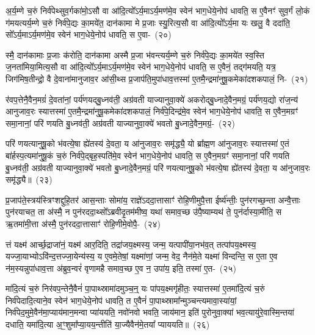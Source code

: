 अ॒र्य॒म्णे च॒रुं निर्व॑पेथ्सुव॒र्गका॑मो॒\-ऽसौ वा आ॑दि॒त्यो᳚\-ऽर्य॒मा\-ऽर्य॒मण॑मे॒व स्वेन॑ भाग॒\-धेये॒नोप॑ धावति॒ स ए॒वैनꣳ॑ सुव॒र्गं लो॒कं ग॑मयत्यर्य॒म्णे च॒रुं निर्व॑पे॒द्यः का॒मये॑त॒ दान॑कामा मे प्र॒जाः स्यु॒रित्य॒सौ वा आ॑दि॒त्यो᳚\-ऽर्य॒मा यः खलु॒ वै ददा॑ति॒ सो᳚\-ऽर्य॒मा\-ऽर्य॒मण॑मे॒व स्वेन॑ भाग॒\-धेये॒नोप॑ धावति॒ स ए॒वा-~(२०)\ip

स्मै॒ दान॑कामाः प्र॒जाः क॑रोति॒ दान॑कामा अस्मै प्र॒जा भ॑वन्त्यर्य॒म्णे च॒रुं निर्व॑पे॒द्यः का॒मये॑त स्व॒स्ति ज॒नता॑मिया॒मित्य॒सौ वा आ॑दि॒त्यो᳚\-ऽर्य॒मा\-ऽर्य॒मण॑मे॒व स्वेन॑ भाग॒\-धेये॒नोप॑ धावति॒ स ए॒वैनं॒ तद्ग॑मयति॒ यत्र॒ जिग॑मिष॒तीन्द्रो॒ वै दे॒वाना॑मानुजाव॒र आ॑सी॒थ्स प्र॒जा\-प॑ति॒मुपा॑धाव॒त्तस्मा॑ ए॒तमै॒न्द्रमा॑नुषू॒कमेका॑\-दश\-कपालं॒ नि-~(२१)\ip

र॑वप॒त्तेनै॒वैन॒मग्रं॑ दे॒वता॑नां॒ पर्य॑णयद्बु॒ध्नव॑ती॒ अग्र॑वती याज्यानुवा॒क्ये॑ अकरोद्बु॒ध्नादे॒वैन॒मग्रं॒ पर्य॑णय॒द्यो रा॑ज॒न्य॑ आनुजाव॒रः स्यात्तस्मा॑ ए॒तमै॒न्द्रमा॑नुषू॒कमेका॑\-दश\-कपालं॒ निर्व॑पे॒दिन्द्र॑मे॒व स्वेन॑ भाग॒\-धेये॒नोप॑ धावति॒ स ए॒वैन॒मग्रꣳ॑ समा॒नानां॒ परि॑ णयति बु॒ध्नव॑ती॒ अग्र॑वती याज्यानुवा॒क्ये॑ भवतो बु॒ध्नादे॒वैन॒मग्रं॒-~(२२)\ip

परि॑ णयत्यानुषू॒को भ॑वत्ये॒षा ह्ये॑तस्य॑ दे॒वता॒ य आ॑नुजाव॒रः समृ॑द्ध्यै॒ यो ब्रा᳚ह्म॒ण आ॑नुजाव॒रः स्यात्तस्मा॑ ए॒तं बा॑र्\mbox{}हस्प॒त्यमा॑नुषू॒कं च॒रुं निर्व॑पे॒द्बृह॒स्पति॑मे॒व स्वेन॑ भाग॒\-धेये॒नोप॑ धावति॒ स ए॒वैन॒मग्रꣳ॑ समा॒नानां॒ परि॑ णयति बु॒ध्नव॑ती॒ अग्र॑वती याज्यानुवा॒क्ये॑ भवतो बु॒ध्नादे॒वैन॒मग्रं॒ परि॑ णयत्यानुषू॒को भ॑वत्ये॒षा ह्ये॑तस्य॑ दे॒वता॒ य आ॑नुजाव॒रः समृ॑द्ध्यै॥~(२३)\ip

{\anuvakamend[{ए॒व निरग्र॑मे॒तस्य॑ च॒त्वारि॑ च}]}

प्र॒जा\-प॑ते॒स्त्रय॑स्त्रिꣳशद्दुहि॒तर॑ आस॒न्ताः सोमा॑य॒ राज्ञे॑\-ऽददा॒त्तासाꣳ॑ रोहि॒णीमुपै॒त्ता ईर्ष्य॑न्तीः॒ पुन॑रगच्छ॒न्ता अन्वै॒त्ताः पुन॑रयाचत॒ ता अ॑स्मै॒ न पुन॑रददा॒थ्सो᳚\-ऽब्रवीदृ॒तम॑मीष्व॒ यथा॑ समाव॒च्छ उ॑पै॒ष्याम्यथ॑ ते॒ पुन॑र्दास्या॒मीति॒ स ऋ॒तमा॑मी॒त्ता अ॑स्मै॒ पुन॑रददा॒त्तासाꣳ॑ रोहि॒णीमे॒वोपै॒-~(२४)\ip

त्तं यक्ष्म॑ आर्च्छ॒द्राजा॑नं॒ यक्ष्म॑ आर॒दिति॒ तद्रा॑जय॒क्ष्मस्य॒ जन्म॒ यत्पापी॑या॒नभ॑व॒त् तत्पा॑प\-य॒क्ष्मस्य॒ यज्जा॒याभ्यो\-ऽवि॑न्द॒त्तज्जा॒येन्य॑स्य॒ य ए॒वमे॒तेषां॒ यक्ष्मा॑णां॒ जन्म॒ वेद॒ नैन॑मे॒ते यक्ष्मा॑ विन्दन्ति॒ स ए॒ता ए॒व न॑म॒स्यन्नुपा॑धाव॒त्ता अ॑ब्रुव॒न्वरं॑ वृणामहै समाव॒च्छ ए॒व न॒ उपा॑य॒ इति॒ तस्मा॑ ए॒त-~(२५)\ip

मा॑दि॒त्यं च॒रुं निर॑वप॒न्तेनै॒वैनं॑ पा॒पाथ्स्रामा॑दमुञ्च॒न्॒ यः पा॑पय॒क्ष्मगृ॑हीतः॒ स्यात्तस्मा॑ ए॒तमा॑दि॒त्यं च॒रुं निर्व॑पेदादि॒त्याने॒व स्वेन॑ भाग॒\-धेये॒नोप॑ धावति॒ त ए॒वैनं॑ पा॒पाथ्स्रामा᳚न्मुञ्च\-न्त्यमा\-वा॒स्या॑यां॒ निर्व॑पेद॒मुमे॒वैन॑मा॒प्याय॑मान॒मन्वा प्या॑ययति॒ नवो॑नवो भवति॒ जाय॑\-मान॒ इति॑ पुरोनुवा॒क्या॑ भव॒त्यायु॑रे॒वास्मि॒न्तया॑ दधाति॒ यमा॑\-दि॒त्या अ॒ꣳ॒शुमा᳚प्या॒यय॒न्तीति॑ या॒ज्यैवैन॑मे॒तया᳚ प्याययति॥~(२६)\ip

